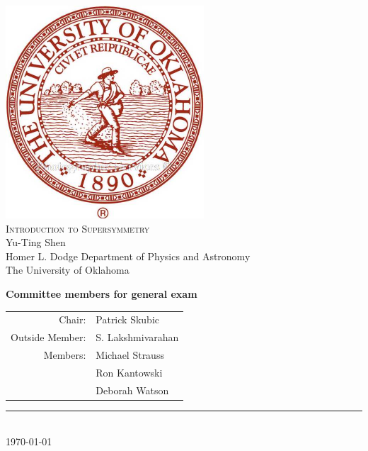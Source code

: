 \documentclass[12pt]{report}
\newcommand{\HRule}{\rule{\linewidth}{0.3mm}}
\begin{document}
\begin{titlepage}
\begin{center}
\includegraphics[scale=0.7]{figures/the_university_of_OK} ~\\[1cm]
\textsc{\Huge{Introduction to Supersymmetry}} ~\\[3cm]
\textsf{\large{Yu-Ting Shen}} \\[0.5cm]
\textsf{\large{Homer L. Dodge Department of Physics and Astronomy\\[0.3cm]
The University of Oklahoma}}
\vfill
\begin{flushright}
\begin{minipage}{0.5\textwidth}
\textbf{Committee members for general exam} \\[0.3cm]
\begin{tabular}{rl}
\textsf{Chair:} & \textsf{Patrick Skubic}\\
\textsf{Outside Member:} & \textsf{S. Lakshmivarahan}\\
\textsf{Members:} & \textsf{Michael Strauss}\\
& \textsf{Ron Kantowski}\\
& \textsf{Deborah Watson}
\end{tabular}
\end{minipage}
\end{flushright}
\HRule \\
\large{\today}
\end{center}
\end{titlepage}

\tableofcontents


\end{document}
